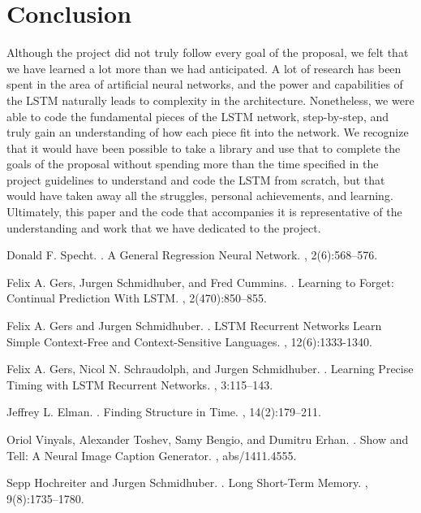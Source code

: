 \documentclass[11pt,letterpaper]{article}
\begin{document}
\section{Conclusion}
Although the project did not truly follow every goal of the proposal, we felt that we have learned a lot more than we had anticipated. A lot of research has been spent in the area of artificial neural networks, and the power and capabilities of the LSTM naturally leads to complexity in the architecture. Nonetheless, we were able to code the fundamental pieces of the LSTM network, step-by-step, and truly gain an understanding of how each piece fit into the network. We recognize that it would have been possible to take a library and use that to complete the goals of the proposal without spending more than the time specified in the project guidelines to understand and code the LSTM from scratch, but that would have taken away all the struggles, personal achievements, and learning. Ultimately, this paper and the code that accompanies it is representative of the understanding and work that we have dedicated to the project.



\begin{thebibliography}{}

Donald F. Specht.
.
\newblock A General Regression Neural Network.
,
2(6):568--576.

Felix A. Gers,  Jurgen Schmidhuber, and Fred Cummins.
.
\newblock Learning to Forget: Continual Prediction With LSTM.
,
2(470):850--855.

Felix A. Gers and Jurgen Schmidhuber.
.
\newblock LSTM Recurrent Networks Learn Simple Context-Free and Context-Sensitive Languages.
,
12(6):1333-1340.

Felix A. Gers, Nicol N. Schraudolph, and Jurgen Schmidhuber.
.
\newblock Learning Precise Timing with LSTM Recurrent Networks.
,
3:115--143.

Jeffrey L. Elman.
.
\newblock Finding Structure in Time.
,
14(2):179--211.

Oriol Vinyals, Alexander Toshev, Samy Bengio, and Dumitru Erhan.
.
\newblock Show and Tell: A Neural Image Caption Generator.
,
abs/1411.4555.

Sepp Hochreiter and Jurgen Schmidhuber.
.
\newblock Long Short-Term Memory.
,
9(8):1735--1780.

\end{thebibliography}
\end{document}
